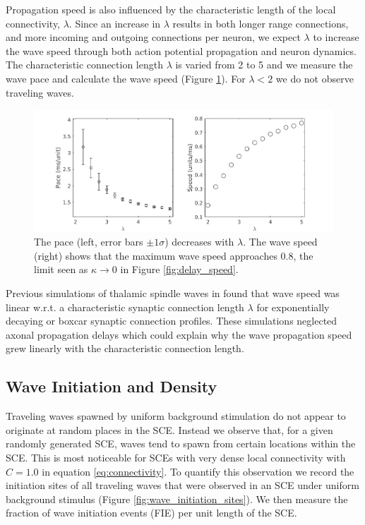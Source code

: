 \documentclass[12pt]{article}
\begin{document}
Propagation speed is also influenced by the characteristic length of the local connectivity, $\lambda$.
Since an increase in $\lambda$ results in both longer range connections, and more incoming and outgoing connections per neuron, we expect $\lambda$ to increase the wave speed through both action potential propagation and neuron dynamics.
The characteristic connection length $\lambda$ is varied from 2 to 5 and we measure the wave pace and calculate the wave speed (Figure \ref{fig:delay_lambda}).
For \color{red}$\lambda<2$\color{black} we do not observe traveling waves.
\begin{figure}[!htb]
 \caption{ The pace (left, error bars $\pm 1 \sigma$) decreases with $\lambda$. The wave speed (right) shows that the maximum wave speed approaches $0.8$, the limit seen as $\kappa \rightarrow 0$ in Figure \ref{fig:delay_speed}. }
 \label{fig:delay_lambda}
 \centering
   \includegraphics[width=\textwidth]{fig/WaveSpeed_Lambda}
\end{figure}
\color{red}Previous simulations of thalamic spindle waves in \parencite{Golomb1996} found that wave speed was linear w.r.t. a characteristic synaptic connection length $\lambda$ for exponentially decaying or boxcar synaptic connection profiles.
These simulations neglected axonal propagation delays which could explain why the wave propagation speed grew linearly with the characteristic connection length. \color{black}

\FloatBarrier


\subsection{Wave Initiation and Density} \label{sub:wave_initiation}
Traveling waves spawned by uniform background stimulation do not appear to originate at random places in the SCE.
Instead we observe that, for a given randomly generated SCE, waves tend to spawn from certain locations within the SCE.
This is most noticeable for SCEs with very dense local connectivity with $C=1.0$ in equation \ref{eq:connectivity}.
To quantify this observation we record the initiation sites of all traveling waves that were observed in an SCE under uniform background stimulus (Figure \ref{fig:wave_initiation_sites}).
We then measure the fraction of wave initiation events (FIE) per unit length of the SCE.
\end{document}
